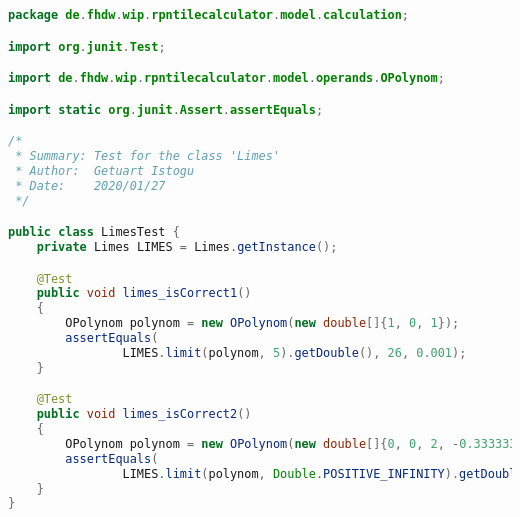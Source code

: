 \begin{lstlisting}[caption=LimesTest (Istogu),label=list:LimesTest,language=Java]
package de.fhdw.wip.rpntilecalculator.model.calculation;

import org.junit.Test;

import de.fhdw.wip.rpntilecalculator.model.operands.OPolynom;

import static org.junit.Assert.assertEquals;

/*
 * Summary: Test for the class 'Limes'
 * Author:  Getuart Istogu
 * Date:    2020/01/27
 */

public class LimesTest {
    private Limes LIMES = Limes.getInstance();

    @Test
    public void limes_isCorrect1()
    {
        OPolynom polynom = new OPolynom(new double[]{1, 0, 1});
        assertEquals(
                LIMES.limit(polynom, 5).getDouble(), 26, 0.001);
    }

    @Test
    public void limes_isCorrect2()
    {
        OPolynom polynom = new OPolynom(new double[]{0, 0, 2, -0.333333333  });
        assertEquals(
                LIMES.limit(polynom, Double.POSITIVE_INFINITY).getDouble(), Double.NEGATIVE_INFINITY, 0.001);
    }
}
\end{lstlisting}    

